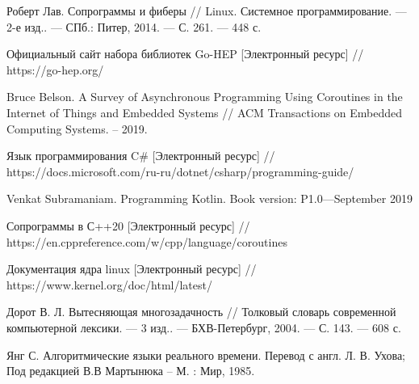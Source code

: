 \begin{flushleft}
\begin{thebibliography}{}
	Роберт Лав. Сопрограммы и фиберы // Linux. Системное программирование. — 2-е изд.. — 
	СПб.: Питер, 2014. — С. 261. — 448 с. 

	Официальный сайт набора библиотек Go-HEP
	[Электронный ресурс] //
	https://go-hep.org/

	Bruce Belson. A Survey of Asynchronous Programming Using Coroutines in the Internet of Things and Embedded Systems //
	ACM Transactions on Embedded Computing Systems. -- 2019.
	
	Язык программирования C\#
	[Электронный ресурс] //
	https://docs.microsoft.com/ru-ru/dotnet/csharp/programming-guide/
	
	Venkat Subramaniam. Programming Kotlin. Book version: P1.0—September 2019
	
	Сопрограммы в С++20
	[Электронный ресурс] //
	https://en.cppreference.com/w/cpp/language/coroutines

	Документация ядра linux 
	[Электронный ресурс] //
	https://www.kernel.org/doc/html/latest/
	
	Дорот В. Л. Вытесняющая многозадачность // Толковый словарь современной компьютерной лексики. — 3 изд.. — БХВ-Петербург, 2004. — С. 143. — 608 с.
	
	Янг С. Алгоритмические языки реального времени. Перевод с англ. Л. В. Ухова; Под редакцией В.В Мартынюка
	-- М. : Мир, 1985.
\end{thebibliography}
\end{flushleft}
\endgroup

\clearpage
